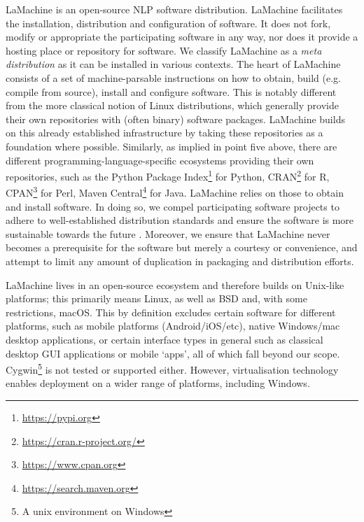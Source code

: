 \documentclass[a4paper,11pt]{article}
\begin{document}
LaMachine is an open-source NLP software distribution.  LaMachine facilitates the installation, distribution and configuration of software. It does not fork, modify or appropriate the participating software in any way, nor does it provide a hosting place or repository for software.
We classify LaMachine as a \emph{meta distribution} as it can be installed in various contexts. The heart of LaMachine consists of a
set of machine-parsable instructions on how to obtain, build (e.g. compile from source), install and configure software.
This is notably different from the more
classical notion of Linux distributions, which generally provide their own repositories with (often binary) software
packages. LaMachine builds on this already established infrastructure by taking these repositories as a foundation where
possible. Similarly, as implied in point five above, there are different programming-language-specific ecosystems
providing their own repositories, such as the Python Package Index\footnote{\url{https://pypi.org}} for Python,
CRAN\footnote{\url{https://cran.r-project.org/}} for R, CPAN\footnote{\url{https://www.cpan.org}} for Perl, Maven
Central\footnote{\url{https://search.maven.org}} for Java.  LaMachine relies on those to obtain and install software. In doing so, we compel participating software projects
to adhere to well-established distribution standards and ensure the software is more sustainable towards the future
\cite{softwarequality}. Moreover, we ensure that LaMachine never becomes a prerequisite for the software but merely a
courtesy or convenience, and attempt to limit any amount of duplication in packaging and distribution efforts.

LaMachine lives in an open-source ecosystem and therefore builds on Unix-like platforms; this primarily means Linux, as well as BSD and, with some restrictions, macOS. This by definition excludes certain software for different platforms, such as mobile platforms (Android/iOS/etc), native Windows/mac desktop applications, or certain interface types in general such as classical desktop GUI applications or mobile `apps', all of which fall beyond our scope. Cygwin\footnote{A unix environment on Windows} is not tested or
 supported either. However, virtualisation technology enables deployment on a wider range of platforms, including Windows.
\end{document}
